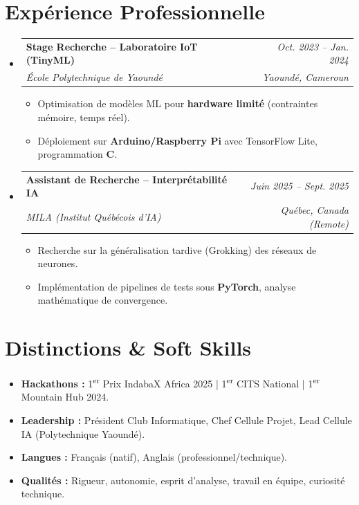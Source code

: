 \documentclass[a4paper,11pt]{article}
\makeatletter
\newcommand{\resumeSubheading}[4]{
  \vspace{-1pt}\item
    \begin{tabular*}{0.97\textwidth}[t]{l@{\extracolsep{\fill}}r}
      \textbf{#1} & \textit{\small #2} \\
      \textit{\small #3} & \textit{\small #4} \\
    \end{tabular*}\vspace{-5pt}
}
\makeatother
\begin{document}
\section{Expérience Professionnelle}
\begin{itemize}[leftmargin=*, label={-}]

    \resumeSubheading
      {Stage Recherche -- Laboratoire IoT (TinyML)}{Oct. 2023 -- Jan. 2024}
      {École Polytechnique de Yaoundé}{Yaoundé, Cameroun}
      \begin{itemize}[leftmargin=0.4cm, nosep, label=\tiny$\bullet$]
        \item \small{Optimisation de modèles ML pour \textbf{hardware limité} (contraintes mémoire, temps réel).}
        \item \small{Déploiement sur \textbf{Arduino/Raspberry Pi} avec TensorFlow Lite, programmation \textbf{C}.}
      \end{itemize}
    \vspace{2pt}

    \resumeSubheading
      {Assistant de Recherche -- Interprétabilité IA}{Juin 2025 -- Sept. 2025}
      {MILA (Institut Québécois d'IA)}{Québec, Canada (Remote)}
      \begin{itemize}[leftmargin=0.4cm, nosep, label=\tiny$\bullet$]
        \item \small{Recherche sur la généralisation tardive (Grokking) des réseaux de neurones.}
        \item \small{Implémentation de pipelines de tests sous \textbf{PyTorch}, analyse mathématique de convergence.}
      \end{itemize}

\end{itemize}

\section{Distinctions \& Soft Skills}
\begin{itemize}[leftmargin=*, nosep]
    \item \textbf{Hackathons :} 1\textsuperscript{er} Prix IndabaX Africa 2025 | 1\textsuperscript{er} CITS National | 1\textsuperscript{er} Mountain Hub 2024.
    \item \textbf{Leadership :} Président Club Informatique, Chef Cellule Projet, Lead Cellule IA (Polytechnique Yaoundé).
    \item \textbf{Langues :} Français (natif), Anglais (professionnel/technique).
    \item \textbf{Qualités :} Rigueur, autonomie, esprit d'analyse, travail en équipe, curiosité technique.
\end{itemize}
\end{document}
